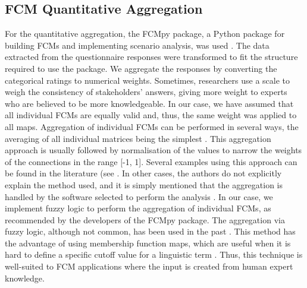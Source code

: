 \begin{appendices}
\begin{xltabular}{\textwidth}{XX}
\end{xltabular}

\clearpage


\subsection{FCM Quantitative Aggregation}
\label{quantitativeAgg}

For the quantitative aggregation, the FCMpy package, a Python package for building FCMs and implementing scenario analysis, was used \citep{mkhitaryan2022fcmpy}. The data extracted from the questionnaire responses were transformed to fit the structure required to use the package. We aggregate the responses by converting the categorical ratings to numerical weights. Sometimes, researchers use a scale to weigh the consistency of stakeholders' answers, giving more weight to experts who are believed to be more knowledgeable. In our case, we have assumed that all individual FCMs are equally valid and, thus, the same weight was applied to all maps. Aggregation of individual FCMs can be performed in several ways, the averaging of all individual matrices being the simplest \citep{jetter2014fuzzy}. This aggregation approach is usually followed by normalisation of the values to narrow the weights of the connections in the range [-1, 1]. Several examples using this approach can be found in the literature (see \citep{lopolito2020combined, morone2021using, morone2019promote}. In other cases, the authors do not explicitly explain the method used, and it is simply mentioned that the aggregation is handled by the software selected to perform the analysis \cite{konti2022determinants, kokkinos2020circular, falcone2020use}. In our case, we implement fuzzy logic to perform the aggregation of individual FCMs, as recommended by the developers of the FCMpy package. The aggregation via fuzzy logic, although not common, has been used in the past \citep{nasirzadeh2020modelling, amini2022combined}. This method has the advantage of using membership function maps, which are useful when it is hard to define a specific cutoff value for a linguistic term \citep{wang2015study}. Thus, this technique is well-suited to FCM applications where the input is created from human expert knowledge. 


\end{appendices}
